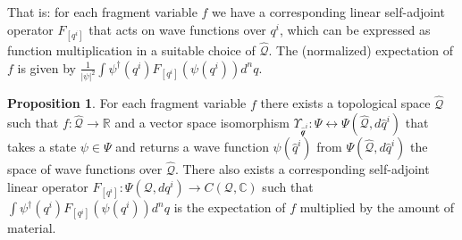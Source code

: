 \documentclass[smallextended]{svjour3}
\numberwithin{equation}{section}
\theoremstyle{definition}
\newtheorem{prop}[equation]{Proposition}
\begin{document}
That is: for each fragment variable $f$ we have a corresponding linear self-adjoint operator $F_{[q^i]}$ that acts on wave functions over $q^i$, which can be expressed as function multiplication in a suitable choice of $\hat{\mathcal{Q}}$. The (normalized) expectation of $f$ is given by $\frac{1}{|\psi|^2}\int \psi^\dagger(q^i) F_{[q^i]} (\psi(q^i)) d^nq$.

\begin{prop}\label{prop:self_adjoint_operators}
	For each fragment variable $f$ there exists a topological space $\hat{\mathcal{Q}}$ such that $f : \hat{\mathcal{Q}} \rightarrow \mathbb{R}$ and a vector space isomorphism $\Upsilon_{\hat{\mathcal{q}}^i} : \Psi \leftrightarrow \Psi(\hat{\mathcal{Q}}, d\hat{q}^i)$ that takes a state $\psi \in \Psi$ and returns a wave function $\psi(\hat{q}^i)$ from $\Psi(\hat{\mathcal{Q}}, d\hat{q}^i)$ the space of wave functions over $\hat{\mathcal{Q}}$. There also exists a corresponding self-adjoint linear operator $F_{[q^i]} : \Psi(\mathcal{Q}, dq^i) \rightarrow C(\mathcal{Q}, \mathbb{C})$ such that $\int \psi^\dagger(q^i) F_{[q^i]}( \psi(q^i))d^nq $ is the expectation of $f$ multiplied by the amount of material. 
\end{prop}
\end{document}
